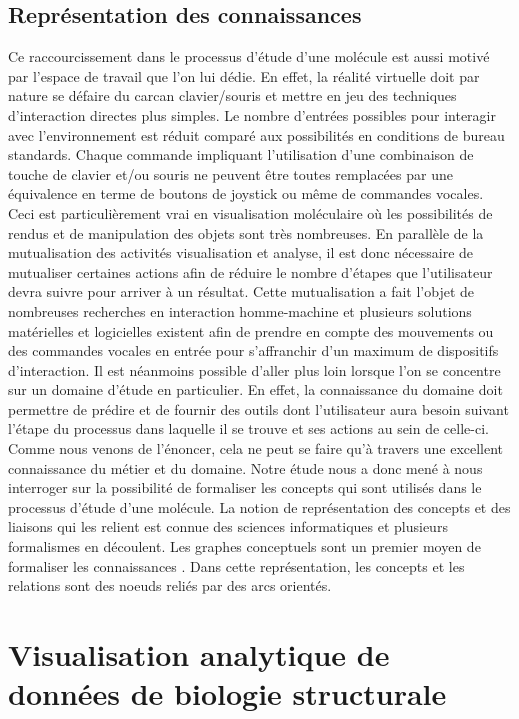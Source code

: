 \subsection{Représentation des connaissances}
Ce raccourcissement dans le processus d'étude d'une molécule est aussi motivé par l'espace de travail que l'on lui dédie. En effet, la réalité virtuelle doit par nature se défaire du carcan clavier/souris et mettre en jeu des techniques d'interaction directes plus simples. Le nombre d'entrées possibles pour interagir avec l'environnement est réduit comparé aux possibilités en conditions de bureau standards. Chaque commande impliquant l'utilisation d'une combinaison de touche de clavier et/ou souris ne peuvent être toutes remplacées par une équivalence en terme de boutons de joystick ou même de commandes vocales. Ceci est particulièrement vrai en visualisation moléculaire où les possibilités de rendus et de manipulation des objets sont très nombreuses. En parallèle de la mutualisation des activités visualisation et analyse, il est donc nécessaire de mutualiser certaines actions afin de réduire le nombre d'étapes que l'utilisateur devra suivre pour arriver à un résultat. Cette mutualisation a fait l'objet de nombreuses recherches en interaction homme-machine et plusieurs solutions matérielles et logicielles existent afin de prendre en compte des mouvements ou des commandes vocales en entrée pour s'affranchir d'un maximum de dispositifs d'interaction. 
Il est néanmoins possible d'aller plus loin lorsque l'on se concentre sur un domaine d'étude en particulier. En effet, la connaissance du domaine doit permettre de prédire et de fournir des outils dont l'utilisateur aura besoin suivant l'étape du processus dans laquelle il se trouve et ses actions au sein de celle-ci. Comme nous venons de l'énoncer, cela ne peut se faire qu'à travers une excellent connaissance du métier et du domaine. Notre étude nous a donc mené à nous interroger sur la possibilité de formaliser les concepts qui sont utilisés dans le processus d'étude d'une molécule.
La notion de représentation des concepts et des liaisons qui les relient est connue des sciences informatiques et plusieurs formalismes en découlent. Les graphes conceptuels sont un premier moyen de formaliser les connaissances \cite{chein2008graph}. Dans cette représentation, les concepts et les relations sont des noeuds reliés par des arcs orientés.

\section{Visualisation analytique de données de biologie structurale}
\label{Sec:visuAnalyticsStructBio}

